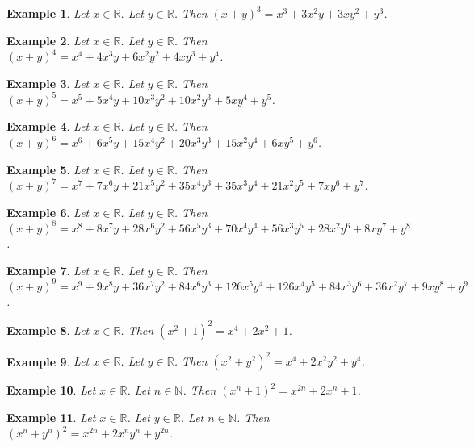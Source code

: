 \documentclass{article}
\newtheorem{example}{Example}
\begin{document}
\begin{example}
Let $x\in\mathbb{R}$. Let $y\in\mathbb{R}$. Then ${(x+y)}^3=x^3+3x^2y+3xy^2+y^3$.
\end{example}

\begin{example}
Let $x\in\mathbb{R}$. Let $y\in\mathbb{R}$. Then ${(x+y)}^4=x^4+4x^3y+6x^2y^2+4xy^3+y^4$.
\end{example}

\begin{example}
Let $x\in\mathbb{R}$. Let $y\in\mathbb{R}$. Then ${(x+y)}^5=x^5+5x^4y+10x^3y^2+10x^2y^3+5xy^4+y^5$.
\end{example}

\begin{example}
Let $x\in\mathbb{R}$. Let $y\in\mathbb{R}$. Then ${(x+y)}^6=x^6+6x^5y+15x^4y^2+20x^3y^3+15x^2y^4+6xy^5+y^6$.
\end{example}

\begin{example}
Let $x\in\mathbb{R}$. Let $y\in\mathbb{R}$. Then ${(x+y)}^7=x^7+7x^6y+21x^5y^2+35x^4y^3+35x^3y^4+21x^2y^5+7xy^6+y^7$.
\end{example}

\begin{example}
Let $x\in\mathbb{R}$. Let $y\in\mathbb{R}$. Then ${(x+y)}^8=x^8+8x^7y+28x^6y^2+56x^5y^3+70x^4y^4+56x^3y^5+28x^2y^6+8xy^7+y^8$.
\end{example}

\begin{example}
Let $x\in\mathbb{R}$. Let $y\in\mathbb{R}$. Then ${(x+y)}^9=x^9+9x^8y+36x^7y^2+84x^6y^3+126x^5y^4+126x^4y^5+84x^3y^6+36x^2y^7+9xy^8+y^9$.
\end{example}

\begin{example}
Let $x\in\mathbb{R}$. Then ${(x^2+1)}^2=x^4+2x^2+1$.
\end{example}

\begin{example}
Let $x\in\mathbb{R}$. Let $y\in\mathbb{R}$. Then ${(x^2+y^2)}^2=x^4+2x^2y^2+y^4$.
\end{example}

\begin{example}
Let $x\in\mathbb{R}$. Let $n\in\mathbb{N}$. Then ${(x^n+1)}^2=x^{2n}+2x^n+1$.
\end{example}

\begin{example}
Let $x\in\mathbb{R}$. Let $y\in\mathbb{R}$. Let $n\in\mathbb{N}$. Then ${(x^n+y^n)}^2=x^{2n}+2x^ny^n+y^{2n}$.
\end{example}
\end{document}
